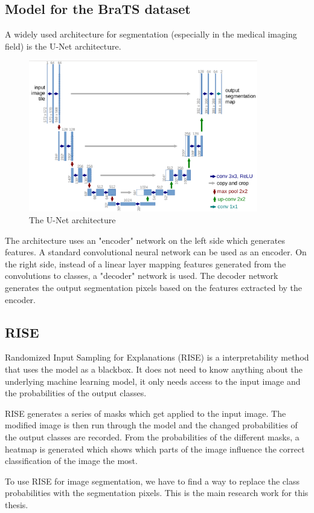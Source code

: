 \subsection{Model for the BraTS dataset}
A widely used architecture for segmentation (especially in the medical imaging field) is the U-Net\cite{ronneberger2015u} architecture.

\begin{figure}[H]
\centering
\caption{The U-Net architecture}
\includegraphics[width=10cm]{images/unet.png}
\end{figure}

The architecture uses an "encoder" network on the left side which generates features. A standard convolutional neural network can be used as an encoder. On the right side, instead of a linear layer mapping features generated from the convolutions to classes, a "decoder" network is used. The decoder network generates the output segmentation pixels based on the features extracted by the encoder. 

\subsection{RISE}
Randomized Input Sampling for Explanations (RISE) is a interpretability method that uses the model as a blackbox. It does not need to know anything about the underlying machine learning model, it only needs access to the input image and the probabilities of the output classes.

RISE generates a series of masks which get applied to the input image. The modified image is then run through the model and the changed probabilities of the output classes are recorded. From the probabilities of the different masks, a heatmap is generated which shows which parts of the image influence the correct classification of the image the most.

To use RISE for image segmentation, we have to find a way to replace the class probabilities with the segmentation pixels. This is the main research work for this thesis.

